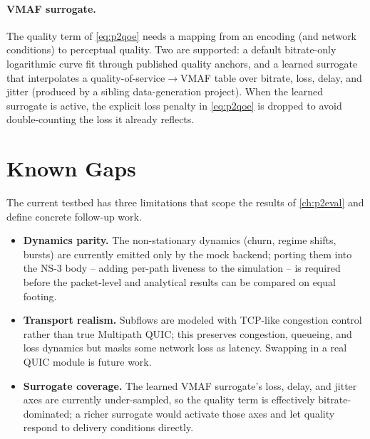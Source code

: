 \paragraph{VMAF surrogate.} The quality term of \cref{eq:p2qoe} needs a mapping from an encoding (and
network conditions) to perceptual quality. Two are supported: a default bitrate-only logarithmic curve fit
through published quality anchors, and a learned surrogate that interpolates a
quality-of-service$\rightarrow$VMAF table over bitrate, loss, delay, and jitter (produced by a sibling
data-generation project). When the learned surrogate is active, the explicit loss penalty in
\cref{eq:p2qoe} is dropped to avoid double-counting the loss it already reflects.

\section{Known Gaps}
\label{sec:p2impl:gaps}

The current testbed has three limitations that scope the results of \cref{ch:p2eval} and define concrete
follow-up work.

\begin{itemize}
  \item \textbf{Dynamics parity.} The non-stationary dynamics (churn, regime shifts, bursts) are
  currently emitted only by the mock backend; porting them into the NS-3 body -- adding per-path liveness
  to the simulation -- is required before the packet-level and analytical results can be compared on equal
  footing. 
  \item \textbf{Transport realism.} Subflows are modeled with TCP-like congestion control rather than true
  Multipath QUIC; this preserves congestion, queueing, and loss dynamics but masks some network loss as
  latency. Swapping in a real QUIC module is future work.
  \item \textbf{Surrogate coverage.} The learned VMAF surrogate's loss, delay, and jitter axes are
  currently under-sampled, so the quality term is effectively bitrate-dominated; a richer surrogate would
  activate those axes and let quality respond to delivery conditions directly.
\end{itemize}

